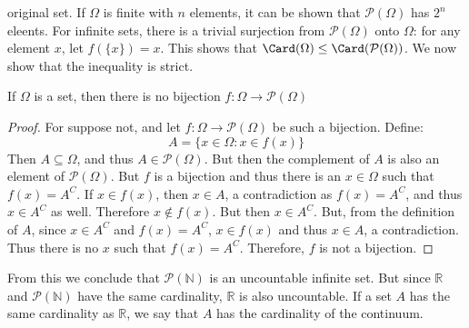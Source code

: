 \documentclass[crop=false,class=book,oneside]{standalone}
\begin{document}
            original set. If $\Omega$ is finite with $n$ elements, it
            can be shown that $\mathcal{P}(\Omega)$ has $2^{n}$
            eleents. For infinite sets, there is a trivial surjection
            from $\mathcal{P}(\Omega)$ onto $\Omega$: for any element
            $x$, let $f(\{x\})=x$. This shows that
            $\Card(\Omega)\leq\Card(\mathcal{P}(\Omega))$. We now show
            that the inequality is strict.
            \begin{theorem}
                If $\Omega$ is a set, then there is no bijection
                $f:\Omega\rightarrow\mathcal{P}(\Omega)$
            \end{theorem}
            \begin{proof}
                For suppose not, and let
                $f:\Omega\rightarrow\mathcal{P}(\Omega)$ be such a
                bijection. Define:
                \begin{equation}
                    A=\{x\in\Omega:x\in{f}(x)\}
                \end{equation}
                Then $A\subseteq\Omega$, and thus
                $A\in\mathcal{P}(\Omega)$. But then the complement of
                $A$ is also an element of $\mathcal{P}(\Omega)$. But
                $f$ is a bijection and thus there is an $x\in\Omega$
                such that $f(x)=A^{C}$. If $x\in{f}(x)$, then
                $x\in{A}$, a contradiction as $f(x)=A^{C}$, and thus
                $x\in{A}^{C}$ as well. Therefore $x\notin{f}(x)$. But
                then $x\in{A}^{C}$. But, from the definition of $A$,
                since $x\in{A}^{C}$ and $f(x)=A^{C}$, $x\in{f}(x)$
                and thus $x\in{A}$, a contradiction. Thus there is no
                $x$ such that $f(x)=A^{C}$. Therefore, $f$ is not a
                bijection.
            \end{proof}
            From this we conclude that $\mathcal{P}(\mathbb{N})$
            is an uncountable infinite set. But since $\mathbb{R}$
            and $\mathcal{P}(\mathbb{N})$ have the same cardinality,
            $\mathbb{R}$ is also uncountable.
            If a set $A$ has the same cardinality as $\mathbb{R}$,
            we say that $A$ has the cardinality of the continuum.
\end{document}
